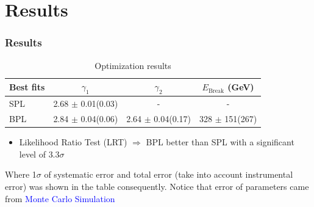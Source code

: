 \documentclass{beamer}
\begin{document}
\section{Results}
\begin{frame}
\frametitle{Results}
\begin{table}
\begin{tabular}{l | c | c | c}
  Best fits & $\gamma_1$ & $\gamma_2$ & $E_{\text{Break}}$ (GeV) \\
  \hline \hline
  SPL & 2.68 $\pm$ 0.01(0.03) & - & -  \\
  BPL & 2.84 $\pm$ 0.04(0.06) & 2.64 $\pm$ 0.04(0.17) & 328 $\pm$ 151(267)
\end{tabular}
\caption{Optimization results}
\end{table}
\begin{itemize}
  \item Likelihood Ratio Test (LRT) $\Rightarrow$ BPL better than SPL with a significant level of \textcolor{olivegreen}{$3.3\sigma$}
\end{itemize}
\small Where 1$\sigma$ of systematic error and total error (take into account instrumental error) was shown in the table consequently. \newline
Notice that error of parameters came from \textcolor{blue}{Monte Carlo Simulation}
\end{frame}
\end{document}
